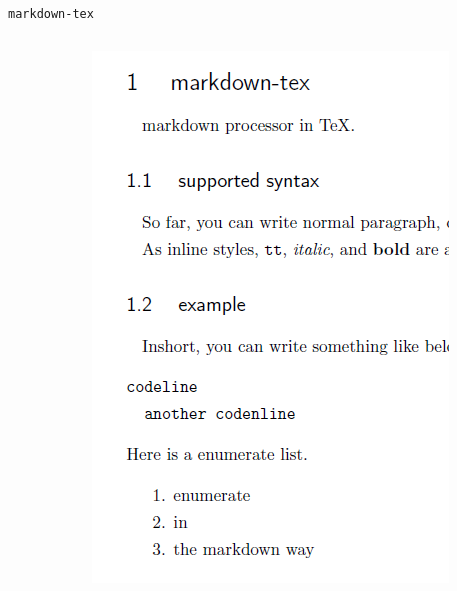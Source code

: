 \documentclass[14pt,dvipdfmx,uplatex]{beamer}
\begin{document}
\begin{frame}[t]{\inhibitglue \texttt{markdown-tex}}
\begin{center}
\begin{columns}[c]
\begin{column}{.4\textwidth}
      \end{column}
      \begin{column}{.4\textwidth}
      \includegraphics[width=\textwidth]{figures/mdtex-output.png}
      \end{column}
    \end{columns}
  \end{center}
\end{frame}

\end{document}
